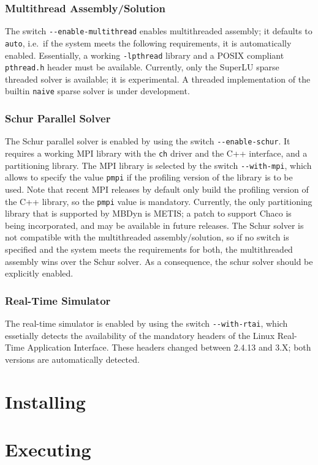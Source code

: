 \documentclass[10pt,dvips]{report}
\newcommand{\kw}[1]{\texttt{#1}}
\begin{document}
\subsection{Multithread Assembly/Solution}
The switch \kw{-{}-enable-multithread} enables multithreaded assembly;
it defaults to \kw{auto}, i.e.\ if the system meets the following
requirements, it is automatically enabled.
Essentially, a working \kw{-lpthread} library and a POSIX compliant
\kw{pthread.h} header must be available.
Currently, only the SuperLU sparse threaded solver is available;
it is experimental.
A threaded implementation of the builtin \kw{naive} sparse solver 
is under development.

\subsection{Schur Parallel Solver}
The Schur parallel solver is enabled by using the switch
\kw{-{}-enable-schur}.
It requires a working MPI library with the \kw{ch} driver 
and the C++ interface, and a partitioning library.
The MPI library is selected by the switch \kw{-{}-with-mpi},
which allows to specify the value \kw{pmpi} if the profiling
version of the library is to be used.
Note that recent MPI releases by default only build the profiling
version of the C++ library, so the \kw{pmpi} value is mandatory.
Currently, the only partitioning library that is supported by MBDyn
is METIS; a patch to support Chaco is being incorporated,
and may be available in future releases.
The Schur solver is not compatible with the multithreaded
assembly/solution, so if no switch is specified and the system
meets the requirements for both, the multithreaded assembly wins
over the Schur solver.
As a consequence, the schur solver should be explicitly enabled.

\subsection{Real-Time Simulator}
The real-time simulator is enabled by using the switch
\kw{-{}-with-rtai}, which essetially detects the availability
of the mandatory headers of the Linux Real-Time Application
Interface.
These headers changed between 2.4.13 and 3.X; both versions 
are automatically detected.

\chapter{Installing}

\chapter{Executing}
\end{document}
